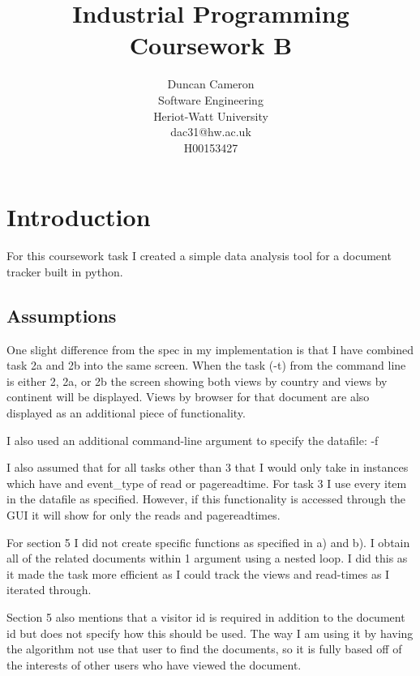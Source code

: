 \documentclass[12pt]{report}
\begin{document}
\title{Industrial Programming Coursework B}
\author{Duncan Cameron \\
Software Engineering \\
Heriot-Watt University \\
dac31@hw.ac.uk\\
H00153427}
\maketitle

\newpage
\tableofcontents
{}

\chapter{Introduction}
For this coursework task I created a simple data analysis tool for a document tracker built in python.
\section{Assumptions}
One slight difference from the spec in my implementation is that I have combined task 2a and 2b into the same screen.  When the task (-t) from the command line is either 2, 2a, or 2b the screen showing both views by country and views by continent will be displayed.  Views by browser for that document are also displayed as an additional piece of functionality.

I also used an additional command-line argument to specify the datafile: -f

I also assumed that for all tasks other than 3 that I would only take in instances which have and event\_type of read or pagereadtime.  For task 3 I use every item in the datafile as specified.  However, if this functionality is accessed through the GUI it will show for only the reads and pagereadtimes.

For section 5 I did not create specific functions as specified in a) and b).  I obtain all of the related documents within 1 argument using a nested loop.  I did this as it made the task more efficient as I could track the views and read-times as I iterated through.

Section 5 also mentions that a visitor id is required in addition to the document id but does not specify how this should be used.  The way I am using it by having the algorithm not use that user to find the documents, so it is fully based off of the interests of other users who have viewed the document.
\end{document}

